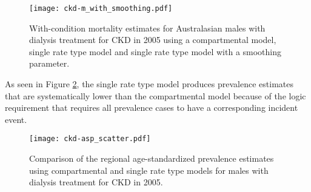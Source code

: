     \begin{figure}[h]
        \begin{center}
            \texttt{[image: ckd-m\_with\_smoothing.pdf]}
            \caption{With-condition mortality estimates for Australasian males with dialysis treatment for CKD in 2005 using a compartmental model, single rate type model and single rate type model with a smoothing parameter.}
            \label{fig:app-CKD smooth}
        \end{center}
    \end{figure}

As seen in Figure \ref{fig:app-CKD asp}, the single rate type model produces prevalence estimates that are systematically lower than the compartmental model because of the logic requirement that requires all prevalence cases to have a corresponding incident event.

    \begin{figure}[h]
        \begin{center}
            \texttt{[image: ckd-asp\_scatter.pdf]}
            \caption{Comparison of the regional age-standardized prevalence estimates using compartmental and single rate type models for males with dialysis treatment for CKD in 2005.}
            \label{fig:app-CKD asp}
        \end{center}
    \end{figure} 